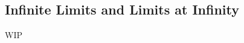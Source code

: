 \documentclass[../poma-notes.tex]{subfiles}
\begin{document}
\subsection*{Infinite Limits and Limits at Infinity}

WIP
\end{document}
